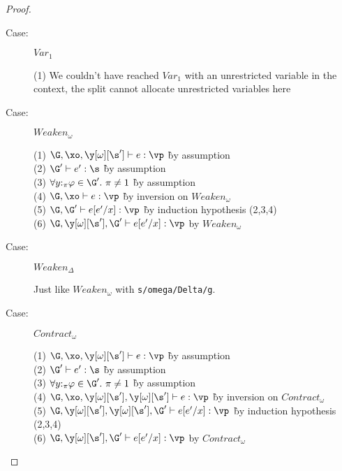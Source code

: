 \begin{proof}
\begin{description}
\item[Case:] $Var_1$
\begin{tabbing}
  (1) We couldn't have reached $Var_1$ with an unrestricted variable in the context, the split cannot allocate unrestricted variables here
\end{tabbing}

\item[Case:] $Weaken_\omega$
\begin{tabbing}
  (1) $\G, \xo, \y[\omega][\s'] \vdash e : \vp$ \` by assumption\\
  (2) $\G' \vdash e' : \s$ \` by assumption\\
  (3) $\hasnolinearvars{\G'}$ \` by assumption\\
  (4) $\G, \xo \vdash e : \vp$ \` by inversion on $Weaken_\omega$\\
  (5) $\G, \G' \vdash e[e'/x] : \vp$ \` by induction hypothesis (2,3,4)\\
  (6) $\G, \y[\omega][\s'], \G' \vdash e[e'/x] : \vp$ by $Weaken_\omega$\\
\end{tabbing}

\item[Case:] $Weaken_\Delta$
\begin{tabbing}
  Just like $Weaken_\omega$ with \texttt{s/omega/Delta/g}.
\end{tabbing}


\item[Case:] $Contract_\omega$
\begin{tabbing}
  (1) $\G, \xo, \y[\omega][\s'] \vdash e : \vp$ \` by assumption\\
  (2) $\G' \vdash e' : \s$ \` by assumption\\
  (3) $\hasnolinearvars{\G'}$ \` by assumption\\
  (4) $\G, \xo, \y[\omega][\s'], \y[\omega][\s'] \vdash e : \vp$ \` by inversion on $Contract_\omega$\\
  (5) $\G, \y[\omega][\s'], \y[\omega][\s'], \G' \vdash e[e'/x] : \vp$ \` by induction hypothesis (2,3,4)\\
  (6) $\G, \y[\omega][\s'], \G' \vdash e[e'/x] : \vp$ by $Contract_\omega$\\
\end{tabbing}


\end{description}
\end{proof}
